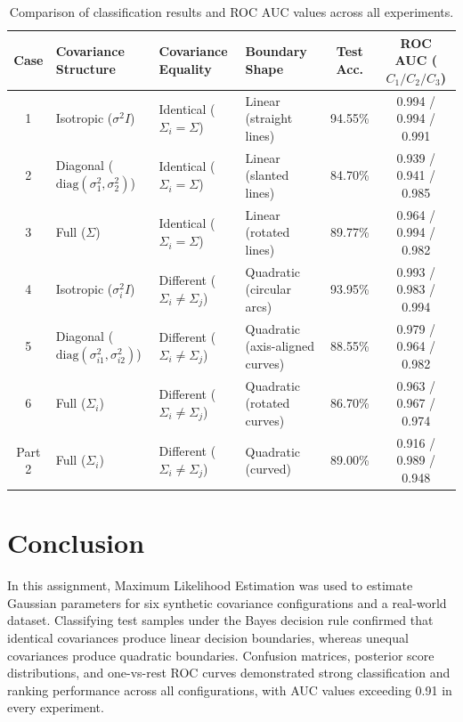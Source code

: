 \documentclass[11pt,a4paper]{article}
\begin{document}
\begin{table}[ht]
\centering
\small
\begin{tabular}{@{}clllcc@{}}
\toprule
\textbf{Case} & \textbf{Covariance Structure} & \textbf{Covariance Equality} & \textbf{Boundary Shape} & \textbf{Test Acc.} & \textbf{ROC AUC ($C_1 / C_2 / C_3$)}\\
\midrule
1 & Isotropic ($\sigma^2 I$) & Identical ($\Sigma_i=\Sigma$) & Linear (straight lines) & 94.55\% & 0.994 / 0.994 / 0.991\\
2 & Diagonal ($\mathrm{diag}(\sigma_1^2,\sigma_2^2)$) & Identical ($\Sigma_i=\Sigma$) & Linear (slanted lines) & 84.70\% & 0.939 / 0.941 / 0.985\\
3 & Full ($\Sigma$) & Identical ($\Sigma_i=\Sigma$) & Linear (rotated lines) & 89.77\% & 0.964 / 0.994 / 0.982\\
4 & Isotropic ($\sigma_i^2 I$) & Different ($\Sigma_i\neq\Sigma_j$) & Quadratic (circular arcs) & 93.95\% & 0.993 / 0.983 / 0.994\\
5 & Diagonal ($\mathrm{diag}(\sigma_{i1}^2,\sigma_{i2}^2)$) & Different ($\Sigma_i\neq\Sigma_j$) & Quadratic (axis-aligned curves) & 88.55\% & 0.979 / 0.964 / 0.982\\
6 & Full ($\Sigma_i$) & Different ($\Sigma_i\neq\Sigma_j$) & Quadratic (rotated curves) & 86.70\% & 0.963 / 0.967 / 0.974\\
\midrule
Part 2 & Full ($\Sigma_i$) & Different ($\Sigma_i\neq\Sigma_j$) & Quadratic (curved) & 89.00\% & 0.916 / 0.989 / 0.948\\
\bottomrule
\end{tabular}
\caption{Comparison of classification results and ROC AUC values across all experiments.}
\label{tab:summary}
\end{table}

\section{Conclusion}
In this assignment, Maximum Likelihood Estimation was used to estimate Gaussian parameters for six synthetic covariance configurations and a real-world dataset. Classifying test samples under the Bayes decision rule confirmed that identical covariances produce linear decision boundaries, whereas unequal covariances produce quadratic boundaries. Confusion matrices, posterior score distributions, and one-vs-rest ROC curves demonstrated strong classification and ranking performance across all configurations, with AUC values exceeding 0.91 in every experiment.
\end{document}
